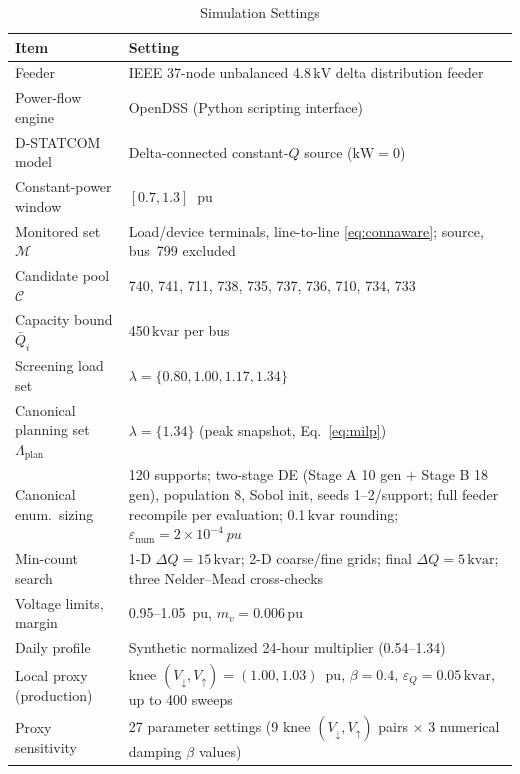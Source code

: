 \documentclass{ieeeaccess}
\newcommand{\SI}[2]{#1\,\ensuremath{\mathrm{#2}}}
\newcommand{\numrange}[2]{#1\mbox{--}#2}
\newcommand{\pu}{\text{ pu}}
\newcommand{\kvar}{\text{kvar}}
\begin{document}
\begin{table}[!t]
	\caption{Simulation Settings}
	\label{tab:settings}
	\centering
	\renewcommand{\arraystretch}{1.2}
	\begin{tabularx}{\columnwidth}{@{}l L@{}}
		\toprule
		\textbf{Item} & \textbf{Setting} \\
		\midrule
		Feeder & IEEE 37-node unbalanced \SI{4.8}{kV} delta distribution feeder \\
		Power-flow engine & OpenDSS (Python scripting interface) \\
		D-STATCOM model & Delta-connected constant-$Q$ source ($\mathrm{kW}=0$) \\
		Constant-power window & $[0.7,1.3]~\pu$ \\
		Monitored set $\mathcal M$ & Load/device terminals, line-to-line \eqref{eq:connaware}; source, bus~799 excluded \\
		Candidate pool $\mathcal C$ & 740, 741, 711, 738, 735, 737, 736, 710, 734, 733 \\
		Capacity bound $\bar Q_i$ & \SI{450}{\kvar} per bus \\
		Screening load set & $\lambda=\{0.80,1.00,1.17,1.34\}$ \\
		Canonical planning set $\Lambda_{\mathrm{plan}}$ & $\lambda=\{1.34\}$ (peak snapshot, Eq.~\eqref{eq:milp}) \\
		Canonical enum.\ sizing & 120 supports; two-stage DE (Stage A 10 gen $+$ Stage B 18 gen), population 8, Sobol init, seeds 1--2/support; full feeder recompile per evaluation; \SI{0.1}{\kvar} rounding; $\varepsilon_{\mathrm{num}}=\ensuremath{2\times10^{-4}}~pu$ \\
		Min-count search & 1-D $\Delta Q=\SI{15}{\kvar}$; 2-D coarse/fine grids; final $\Delta Q=\SI{5}{\kvar}$; three Nelder--Mead cross-checks \\
		Voltage limits, margin & \numrange{0.95}{1.05}~pu, $m_v=\SI{0.006}{pu}$ \\
		Daily profile & Synthetic normalized 24-hour multiplier (\numrange{0.54}{1.34}) \\
		Local proxy (production) & knee $(V_\downarrow,V_\uparrow)=(1.00,1.03)$~pu, $\beta=0.4$, $\varepsilon_Q=\SI{0.05}{\kvar}$, up to 400 sweeps \\
		Proxy sensitivity & 27 parameter settings (9 knee $(V_\downarrow,V_\uparrow)$ pairs $\times$ 3 numerical damping $\beta$ values) \\
		\bottomrule
	\end{tabularx}
\end{table}
\end{document}
